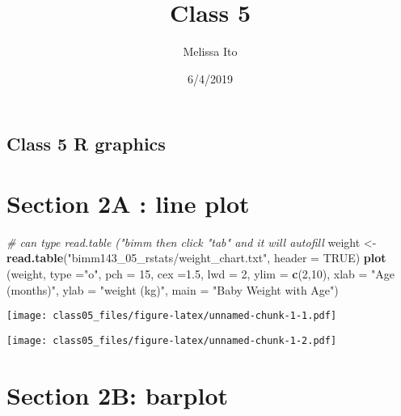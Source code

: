 \documentclass[]{article}
\title{Class 5}
\author{Melissa Ito}
\date{6/4/2019}
\newenvironment{Shaded}{\begin{snugshade}}{\end{snugshade}}
\newcommand{\KeywordTok}[1]{\textcolor[rgb]{0.13,0.29,0.53}{\textbf{#1}}}
\newcommand{\DataTypeTok}[1]{\textcolor[rgb]{0.13,0.29,0.53}{#1}}
\newcommand{\DecValTok}[1]{\textcolor[rgb]{0.00,0.00,0.81}{#1}}
\newcommand{\FloatTok}[1]{\textcolor[rgb]{0.00,0.00,0.81}{#1}}
\newcommand{\StringTok}[1]{\textcolor[rgb]{0.31,0.60,0.02}{#1}}
\newcommand{\CommentTok}[1]{\textcolor[rgb]{0.56,0.35,0.01}{\textit{#1}}}
\newcommand{\OtherTok}[1]{\textcolor[rgb]{0.56,0.35,0.01}{#1}}
\newcommand{\OperatorTok}[1]{\textcolor[rgb]{0.81,0.36,0.00}{\textbf{#1}}}
\newcommand{\NormalTok}[1]{#1}
\begin{document}
\maketitle

\subsection{Class 5 R graphics}\label{class-5-r-graphics}

\section{Section 2A : line plot}\label{section-2a-line-plot}

\begin{Shaded}
\begin{Highlighting}[]
\CommentTok{# can type read.table ("bimm then click "tab" and it will autofill}
\NormalTok{weight <-}\StringTok{ }\KeywordTok{read.table}\NormalTok{(}\StringTok{"bimm143_05_rstats/weight_chart.txt"}\NormalTok{, }\DataTypeTok{header =} \OtherTok{TRUE}\NormalTok{)}
\KeywordTok{plot}\NormalTok{ (weight, }\DataTypeTok{type =}\StringTok{"o"}\NormalTok{, }
      \DataTypeTok{pch =} \DecValTok{15}\NormalTok{, }\DataTypeTok{cex =}\FloatTok{1.5}\NormalTok{, }\DataTypeTok{lwd =} \DecValTok{2}\NormalTok{, }\DataTypeTok{ylim =} \KeywordTok{c}\NormalTok{(}\DecValTok{2}\NormalTok{,}\DecValTok{10}\NormalTok{),}
      \DataTypeTok{xlab =} \StringTok{"Age (months)"}\NormalTok{, }\DataTypeTok{ylab =} \StringTok{"weight (kg)"}\NormalTok{,}
      \DataTypeTok{main =} \StringTok{"Baby Weight with Age"}\NormalTok{)}
\end{Highlighting}
\end{Shaded}

\texttt{[image: class05\_files/figure-latex/unnamed-chunk-1-1.pdf]}

\begin{Shaded}
\end{Shaded}

\texttt{[image: class05\_files/figure-latex/unnamed-chunk-1-2.pdf]}

\section{Section 2B: barplot}\label{section-2b-barplot}
\end{document}
